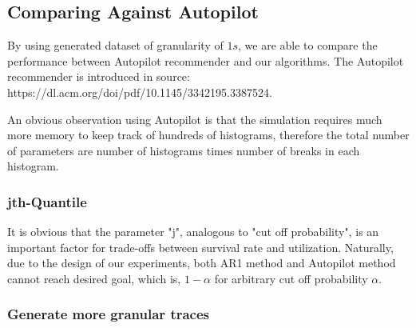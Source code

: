 \documentclass{article}
\begin{document}
\subsection{Comparing Against Autopilot}

\begin{flushleft}
By using generated dataset of granularity of $1s$, we are able to compare the
performance between Autopilot recommender and our algorithms. The Autopilot
recommender is introduced in source:
https://dl.acm.org/doi/pdf/10.1145/3342195.3387524.

An obvious observation using Autopilot is that the simulation requires much more
memory to keep track of hundreds of histograms, therefore the total number of
parameters are number of histograms times number of breaks in each histogram.
\end{flushleft}

\subsubsection{jth-Quantile}
It is obvious that the parameter "j", analogous to "cut off probability", is an
important factor for trade-offs between survival rate and utilization.
Naturally, due to the design of our experiments, both AR1 method and Autopilot
method cannot reach desired goal, which is, $1 - \alpha$ for arbitrary cut off
probability $\alpha$. 

\subsubsection{Generate more granular traces}
\end{document}
